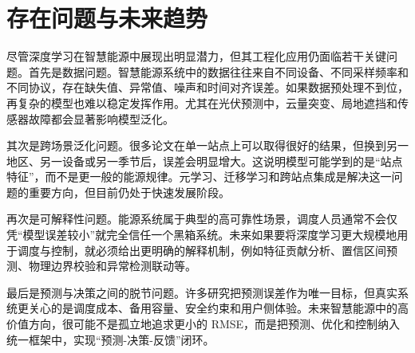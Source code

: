\section{存在问题与未来趋势}
尽管深度学习在智慧能源中展现出明显潜力，但其工程化应用仍面临若干关键问题。首先是数据问题。智慧能源系统中的数据往往来自不同设备、不同采样频率和不同协议，存在缺失值、异常值、噪声和时间对齐误差。如果数据预处理不到位，再复杂的模型也难以稳定发挥作用。尤其在光伏预测中，云量突变、局地遮挡和传感器故障都会显著影响模型泛化。

其次是跨场景泛化问题。很多论文在单一站点上可以取得很好的结果，但换到另一地区、另一设备或另一季节后，误差会明显增大。这说明模型可能学到的是“站点特征”，而不是更一般的能源规律。元学习、迁移学习和跨站点集成是解决这一问题的重要方向，但目前仍处于快速发展阶段。

再次是可解释性问题。能源系统属于典型的高可靠性场景，调度人员通常不会仅凭“模型误差较小”就完全信任一个黑箱系统。未来如果要将深度学习更大规模地用于调度与控制，就必须给出更明确的解释机制，例如特征贡献分析、置信区间预测、物理边界校验和异常检测联动等。

最后是预测与决策之间的脱节问题。许多研究把预测误差作为唯一目标，但真实系统更关心的是调度成本、备用容量、安全约束和用户侧体验。未来智慧能源中的高价值方向，很可能不是孤立地追求更小的 RMSE，而是把预测、优化和控制纳入统一框架中，实现“预测-决策-反馈”闭环。
